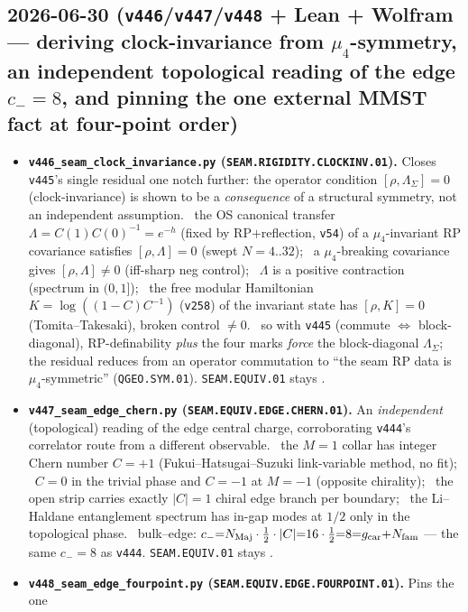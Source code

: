 \subsection*{2026-06-30 (\texttt{v446}/\texttt{v447}/\texttt{v448} + Lean + Wolfram --- deriving clock-invariance from $\mu_4$-symmetry, an independent topological reading of the edge $c_-{=}8$, and pinning the one external MMST fact at four-point order)}
\begin{itemize}
\item \textbf{\texttt{v446\_seam\_clock\_invariance.py} (\texttt{SEAM.RIGIDITY.CLOCKINV.01}).} Closes \texttt{v445}'s single
residual one notch further: the operator condition $[\rho,\Lambda_\Sigma]{=}0$ (clock-invariance) is shown to be a
\emph{consequence} of a structural symmetry, not an independent assumption. \mE\ the OS canonical transfer
$\Lambda{=}C(1)C(0)^{-1}{=}e^{-h}$ (fixed by RP$+$reflection, \texttt{v54}) of a $\mu_4$-invariant RP covariance
satisfies $[\rho,\Lambda]{=}0$ (swept $N{=}4..32$); \mE\ a $\mu_4$-breaking covariance gives $[\rho,\Lambda]\neq0$
(iff-sharp neg control); \mE\ $\Lambda$ is a positive contraction (spectrum in $(0,1]$); \mE\ the free modular
Hamiltonian $K{=}\log((1{-}C)C^{-1})$ (\texttt{v258}) of the invariant state has $[\rho,K]{=}0$ (Tomita--Takesaki),
broken control $\neq0$. \mC\ so with \texttt{v445} (commute $\Leftrightarrow$ block-diagonal), RP-definability
\emph{plus} the four marks \emph{force} the block-diagonal $\Lambda_\Sigma$; the residual reduces from an operator
commutation to ``the seam RP data is $\mu_4$-symmetric'' (\texttt{QGEO.SYM.01}). \texttt{SEAM.EQUIV.01} stays \mO.
\item \textbf{\texttt{v447\_seam\_edge\_chern.py} (\texttt{SEAM.EQUIV.EDGE.CHERN.01}).} An \emph{independent}
(topological) reading of the edge central charge, corroborating \texttt{v444}'s correlator route from a different
observable. \mE\ the $M{=}1$ collar has integer Chern number $C{=}{+}1$ (Fukui--Hatsugai--Suzuki link-variable
method, no fit); \mE\ $C{=}0$ in the trivial phase and $C{=}{-}1$ at $M{=}{-}1$ (opposite chirality); \mE\ the open
strip carries exactly $|C|{=}1$ chiral edge branch per boundary; \mE\ the Li--Haldane entanglement spectrum has
in-gap modes at $1/2$ only in the topological phase. \mC\ bulk--edge: $c_-{=}N_{\mathrm{Maj}}\cdot\tfrac12\cdot|C|
{=}16\cdot\tfrac12{=}8{=}g_{\mathrm{car}}{+}N_{\mathrm{fam}}$ --- the same $c_-{=}8$ as \texttt{v444}. \texttt{SEAM.EQUIV.01} stays \mO.
\item \textbf{\texttt{v448\_seam\_edge\_fourpoint.py} (\texttt{SEAM.EQUIV.EDGE.FOURPOINT.01}).} Pins the one

\end{itemize}
